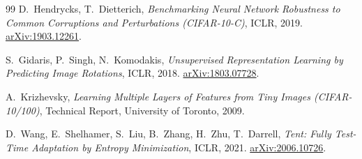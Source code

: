 \documentclass[12pt,a4paper]{report}
\begin{document}
\begin{thebibliography}{99}
		D.~Hendrycks, T.~Dietterich,
		\emph{Benchmarking Neural Network Robustness to Common Corruptions and Perturbations (CIFAR-10-C)},
		ICLR, 2019. \href{https://arxiv.org/abs/1903.12261}{arXiv:1903.12261}.
		
		S.~Gidaris, P.~Singh, N.~Komodakis,
		\emph{Unsupervised Representation Learning by Predicting Image Rotations},
		ICLR, 2018. \href{https://arxiv.org/abs/1803.07728}{arXiv:1803.07728}.
		
		A.~Krizhevsky,
		\emph{Learning Multiple Layers of Features from Tiny Images (CIFAR-10/100)},
		Technical Report, University of Toronto, 2009.
		
		D.~Wang, E.~Shelhamer, S.~Liu, B.~Zhang, H.~Zhu, T.~Darrell,
		\emph{Tent: Fully Test-Time Adaptation by Entropy Minimization},
		ICLR, 2021. \href{https://arxiv.org/abs/2006.10726}{arXiv:2006.10726}.
		
	\end{thebibliography}
	
\end{document}
